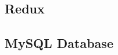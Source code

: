 \subsection{Redux}
\label{section:redux}

\subsection{MySQL Database}
\label{section:mysqlDatabase}





\cite{buildingRESTfulWebServicesWithSpring}
\cite{tamingTheStateInReact}
\cite{highPerformanceMySQL}


